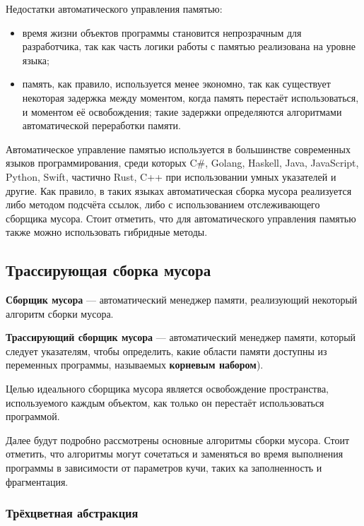 Недостатки автоматического управления памятью: 

\begin{itemize}[label*=---]
	\item время жизни объектов программы становится непрозрачным для разработчика, так как часть логики работы с памятью реализована на уровне языка;
	\item память, как правило, используется менее экономно, так как существует некоторая задержка между моментом, когда память перестаёт использоваться, и моментом её освобождения; такие задержки определяются алгоритмами автоматической переработки памяти.
\end{itemize}

Автоматическое управление памятью используется в большинстве современных языков программирования, среди которых C\#, Golang, Haskell, Java, JavaScript, Python, Swift, частично Rust, C++ при использовании умных указателей и другие. Как правило, в таких языках автоматическая сборка мусора реализуется либо методом подсчёта ссылок, либо с использованием отслеживающего сборщика мусора. \cite{recycling} Стоит отметить, что для автоматического управления памятью также можно использовать гибридные методы. \cite{cornell2} \cite{urc}



\subsection{Трассирующая сборка мусора}

\textbf{Сборщик мусора} \cite{glossary} --- автоматический менеджер памяти, реализующий некоторый алгоритм сборки мусора.

\textbf{Трассирующий сборщик мусора} \cite{recycling} --- автоматический менеджер памяти, который следует указателям, чтобы определить, какие области памяти доступны из переменных программы, называемых \textbf{корневым набором}).

Целью идеального сборщика мусора является освобождение пространства, используемого каждым объектом, как только он перестаёт использоваться программой.

Далее будут подробно рассмотрены основные алгоритмы сборки мусора. Стоит отметить, что алгоритмы могут сочетаться и заменяться во время выполнения программы в зависимости от параметров кучи, таких ка заполненность и фрагментация. \cite{handbook}

\subsubsection{Трёхцветная абстракция}
\label{tricolor}

